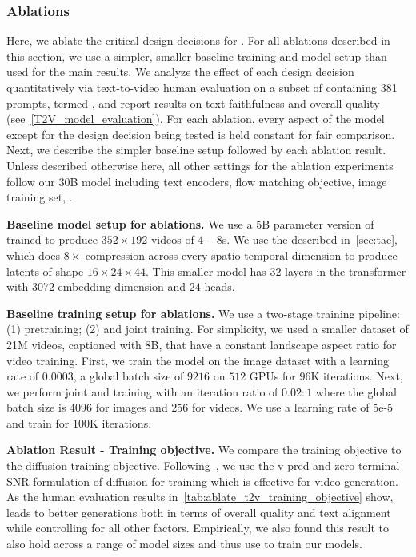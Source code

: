 \subsubsection{Ablations} %
\label{sec:ablations_t2v}




Here, we ablate the critical design decisions for \OursVideo.
For all ablations described in this section, we use a simpler, smaller baseline training and model setup than used for the main results.
We analyze the effect of each design decision quantitatively via text-to-video human evaluation on a subset of \textToVBenchmarkName containing 381 prompts, termed \textToVBenchmarkMiniName, and report results on text faithfulness and overall quality (see~\cref{T2V_model_evaluation}).
For each ablation, every aspect of the model except for the design decision being tested is held constant for fair comparison.
Next, we describe the simpler baseline setup followed by each ablation result.
Unless described otherwise here, all other settings for the ablation experiments follow our $30$B model including text encoders, flow matching objective, image training set, \etc.

\noindent\textbf{Baseline model setup for ablations.}
We use a $5$B parameter version of \OursVideo trained to produce $352\times192$ videos of $4$ -- $8$s.
We use the \taeShort described in~\cref{sec:tae}, which does $8\times$ compression across every spatio-temporal dimension to produce latents of shape $16 \times 24\times 44$.
This smaller \OursVideo model has $32$ layers in the transformer with $3072$ embedding dimension and $24$ heads.

\noindent\textbf{Baseline training setup for ablations.}
We use a two-stage training pipeline: (1) \textToI pretraining; (2) \textToI and \textToV joint training.
For simplicity, we used a smaller dataset of 21M videos, captioned with \llamaVideo $8$B, that have a constant landscape aspect ratio for video training.
First, we train the model on the image dataset with a learning rate of $0.0003$, a global batch size of $9216$ on $512$ GPUs for $96$K iterations.
Next, we perform joint \textToI and \textToV training with an iteration ratio of $0.02:1$ where the global batch size is $4096$ for images and $256$ for videos.
We use a learning rate of 5e-5 and train for $100$K iterations.


\noindent\textbf{Ablation Result - Training objective.}
We compare the \flowmatching training objective to the diffusion training objective.
Following~\citep{emuvideo2023}, we use the v-pred and zero terminal-SNR formulation of diffusion for training which is effective for video generation.
As the human evaluation results in~\cref{tab:ablate_t2v_training_objective} show, \flowmatching leads to better generations both in terms of overall quality and text alignment while controlling for all other factors.
Empirically, we also found this result to also hold across a range of model sizes and thus use \flowmatching to train our models.



